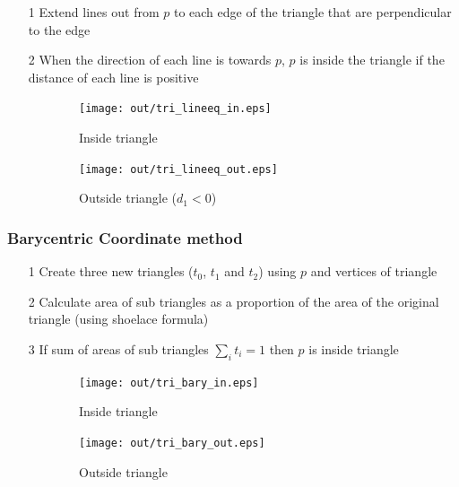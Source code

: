 \documentclass[a4paper]{article}
\begin{document}
\begin{enumerate}
  \item[1] Extend lines out from $p$ to each edge of the triangle that are
           perpendicular to the edge
  \item[2] When the direction of each line is towards $p$, $p$ is inside the
           triangle if the distance of each line is positive
\end{enumerate}

\begin{figure}[h]
  \centering
  \begin{subfigure}[b]{0.48\textwidth}
    \texttt{[image: out/tri\_lineeq\_in.eps]}
    \caption{Inside triangle}
  \end{subfigure}
  \begin{subfigure}[b]{0.48\textwidth}
    \texttt{[image: out/tri\_lineeq\_out.eps]}
    \caption{Outside triangle ($d_{1} < 0$)}
  \end{subfigure}
  \caption{}
  \label{fig:tri_lineeq}
\end{figure}
\FloatBarrier

\subsubsection{Barycentric Coordinate method}
\label{sec:barycentric}

\begin{enumerate}
  \item[1] Create three new triangles ($t_{0}$, $t_{1}$ and $t_{2}$) using $p$
           and vertices of triangle
  \item[2] Calculate area of sub triangles as a proportion of the area of the
           original triangle (using shoelace formula)
  \item[3] If sum of areas of sub triangles $\sum_{i} t_{i} = 1$ then $p$ is
           inside triangle
\end{enumerate}

\begin{figure}[h]
  \centering
  \begin{subfigure}[b]{0.48\textwidth}
    \texttt{[image: out/tri\_bary\_in.eps]}
    \caption{Inside triangle}
  \end{subfigure}
  \begin{subfigure}[b]{0.48\textwidth}
    \texttt{[image: out/tri\_bary\_out.eps]}
    \caption{Outside triangle}
  \end{subfigure}
  \caption{}
  \label{fig:tri_bary}
\end{figure}
\FloatBarrier
\end{document}
